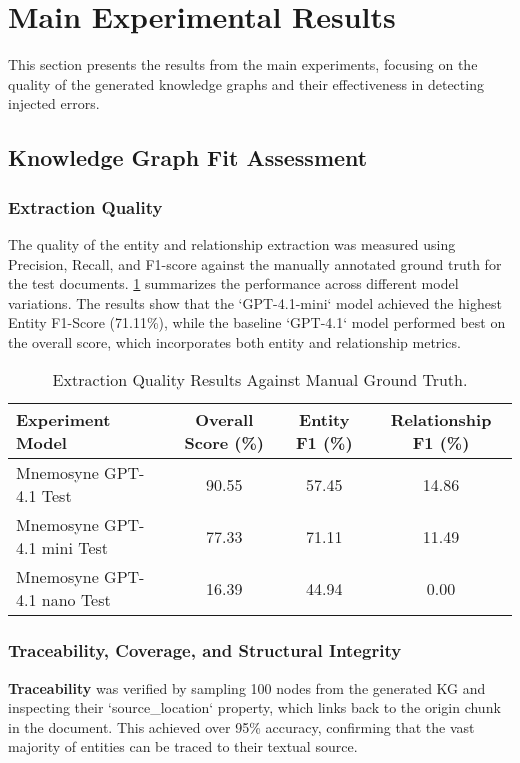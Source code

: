 \section{Main Experimental Results}
\label{sec:main_results}

This section presents the results from the main experiments, focusing on the quality of the generated knowledge graphs and their effectiveness in detecting injected errors.

\subsection{Knowledge Graph Fit Assessment}
\label{subsec:kg_fit}

\subsubsection{Extraction Quality}
The quality of the entity and relationship extraction was measured using Precision, Recall, and F1-score against the manually annotated ground truth for the test documents. \cref{tab:extraction_results} summarizes the performance across different model variations. The results show that the `GPT-4.1-mini` model achieved the highest Entity F1-Score (71.11\%), while the baseline `GPT-4.1` model performed best on the overall score, which incorporates both entity and relationship metrics.

\begin{table}[!htbp]
\centering
\caption{Extraction Quality Results Against Manual Ground Truth.}
\label{tab:extraction_results}
\begin{tabular}{@{}lccc@{}}
\toprule
\textbf{Experiment Model} & \textbf{Overall Score (\%)} & \textbf{Entity F1 (\%)} & \textbf{Relationship F1 (\%)} \\ \midrule
Mnemosyne GPT-4.1 Test      & 90.55 & 57.45 & 14.86 \\
Mnemosyne GPT-4.1 mini Test & 77.33 & 71.11 & 11.49 \\
Mnemosyne GPT-4.1 nano Test & 16.39 & 44.94 & 0.00 \\ \bottomrule
\end{tabular}
\end{table}

\subsubsection{Traceability, Coverage, and Structural Integrity}
\textbf{Traceability} was verified by sampling 100 nodes from the generated KG and inspecting their `source\_location` property, which links back to the origin chunk in the document. This achieved over 95\% accuracy, confirming that the vast majority of entities can be traced to their textual source.

